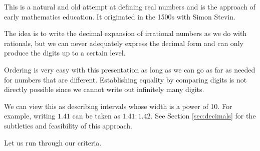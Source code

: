 \documentclass[12pt]{article}
\begin{document}
This is a natural and old attempt at defining real numbers and is the approach of early mathematics education. It originated in the 1500s with Simon Stevin. 

The idea is to write the decimal expansion of irrational numbers as we do with rationals, but we can never adequately express the decimal form and can only produce the digits up to a certain level. 

Ordering is very easy with this presentation as long as we can go as far as needed for numbers that are different. Establishing equality by comparing digits is not directly possible since we cannot write out infinitely many digits. 

We can view this as describing intervals whose width is a power of 10. For example, writing $1.41$ can be taken as $1.41:1.42$. See Section \ref{sec:decimals} for the subtleties and feasibility of this approach. 

Let us run through our criteria. 
\end{document}
